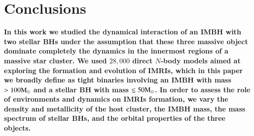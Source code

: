 \documentclass[article]{aa}
\newcommand{\Ms}{{\rm M}_\odot}
\begin{document}
\section{Conclusions}
\label{end}
{\bf 
In this work we studied the dynamical interaction of an IMBH with two stellar BHs under the assumption
that these three massive object dominate completely the dynamics in the innermost regions of a massive star cluster.
We used $28,000$ direct $N$-body models aimed at exploring the formation and evolution of IMRIs, which in this paper we 
broadly define as tight binaries involving an IMBH with mass $> 100 \Ms$ and a stellar BH with mass $\lesssim 50 \Ms$.
In order to assess the role of environments and dynamics on IMRIs formation, we vary the density and metallicity of the 
host cluster, the IMBH mass, the mass spectrum of stellar BHs, and the orbital properties of the three objects. 

}
\end{document}
